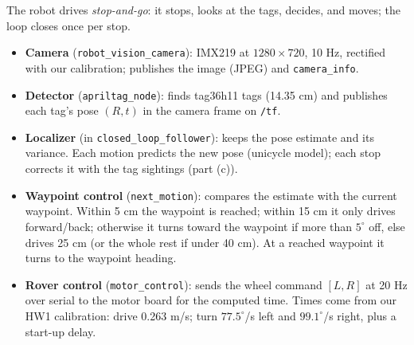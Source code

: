 \documentclass[10pt]{article}
\begin{document}
The robot drives \emph{stop-and-go}: it stops, looks at the tags, decides, and moves; the loop closes once per stop.
\begin{itemize}
  \item \textbf{Camera} (\texttt{robot\_vision\_camera}): IMX219 at $1280\times720$, 10 Hz, rectified with our calibration; publishes the image (JPEG) and \texttt{camera\_info}.
  \item \textbf{Detector} (\texttt{apriltag\_node}): finds tag36h11 tags (14.35 cm) and publishes each tag's pose $(R, t)$ in the camera frame on \texttt{/tf}.
  \item \textbf{Localizer} (in \texttt{closed\_loop\_follower}): keeps the pose estimate and its variance. Each motion predicts the new pose (unicycle model); each stop corrects it with the tag sightings (part (c)).
  \item \textbf{Waypoint control} (\texttt{next\_motion}): compares the estimate with the current waypoint. Within 5 cm the waypoint is reached; within 15 cm it only drives forward/back; otherwise it turns toward the waypoint if more than $5^\circ$ off, else drives 25 cm (or the whole rest if under 40 cm). At a reached waypoint it turns to the waypoint heading.
  \item \textbf{Rover control} (\texttt{motor\_control}): sends the wheel command $[L, R]$ at 20 Hz over serial to the motor board for the computed time. Times come from our HW1 calibration: drive 0.263 m/s; turn $77.5^\circ$/s left and $99.1^\circ$/s right, plus a start-up delay.
\end{itemize}
\end{document}
